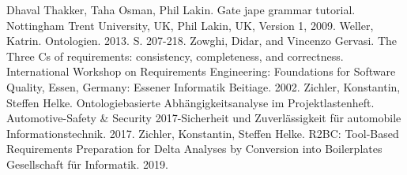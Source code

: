 \documentclass[12pt]{report}
\begin{document}
\begin{thebibliography}{20}
Dhaval Thakker, Taha Osman, Phil Lakin. \glqq Gate jape grammar tutorial.\grqq{} Nottingham Trent University, UK, Phil Lakin, UK, Version 1, 2009.
 Weller, Katrin. \glqq Ontologien.\grqq{} 2013. S. 207-218.
 Zowghi, Didar, and Vincenzo Gervasi. \glqq The Three Cs of requirements: consistency, completeness, and correctness.\grqq{} International Workshop on Requirements Engineering: Foundations for Software Quality, Essen, Germany: Essener Informatik Beitiage. 2002.
 Zichler, Konstantin, Steffen Helke. \glqq Ontologiebasierte Abhängigkeitsanalyse im Projektlastenheft.\grqq{} Automotive-Safety \& Security 2017-Sicherheit und Zuverlässigkeit für automobile Informationstechnik. 2017.
 Zichler, Konstantin, Steffen Helke. \glqq R2BC: Tool-Based Requirements Preparation for Delta Analyses by Conversion into Boilerplates \grqq{} Gesellschaft für Informatik. 2019.


\end{thebibliography}
\end{document}
